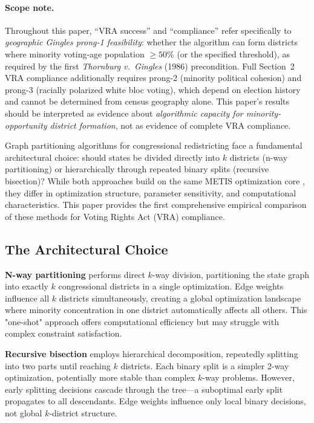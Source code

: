 \paragraph{Scope note.}
Throughout this paper, ``VRA success'' and ``compliance'' refer specifically to
\emph{geographic Gingles prong-1 feasibility}: whether the algorithm can form
districts where minority voting-age population $\geq 50\%$ (or the specified
threshold), as required by the first \textit{Thornburg v.\ Gingles} (1986) precondition.
Full Section~2 VRA compliance additionally requires prong-2 (minority political
cohesion) and prong-3 (racially polarized white bloc voting), which depend on
election history and cannot be determined from census geography alone.
This paper's results should be interpreted as evidence about \emph{algorithmic capacity
for minority-opportunity district formation}, not as evidence of complete VRA compliance.

Graph partitioning algorithms for congressional redistricting face a fundamental architectural choice: should states be divided directly into $k$ districts (n-way partitioning) or hierarchically through repeated binary splits (recursive bisection)? While both approaches build on the same METIS optimization core \citep{karypis1998}, they differ in optimization structure, parameter sensitivity, and computational characteristics. This paper provides the first comprehensive empirical comparison of these methods for Voting Rights Act (VRA) compliance.

\subsection{The Architectural Choice}

\textbf{N-way partitioning} performs direct $k$-way division, partitioning the state graph into exactly $k$ congressional districts in a single optimization. Edge weights influence all $k$ districts simultaneously, creating a global optimization landscape where minority concentration in one district automatically affects all others. This "one-shot" approach offers computational efficiency but may struggle with complex constraint satisfaction.

\textbf{Recursive bisection} employs hierarchical decomposition, repeatedly splitting into two parts until reaching $k$ districts. Each binary split is a simpler 2-way optimization, potentially more stable than complex $k$-way problems. However, early splitting decisions cascade through the tree—a suboptimal early split propagates to all descendants. Edge weights influence only local binary decisions, not global $k$-district structure.

